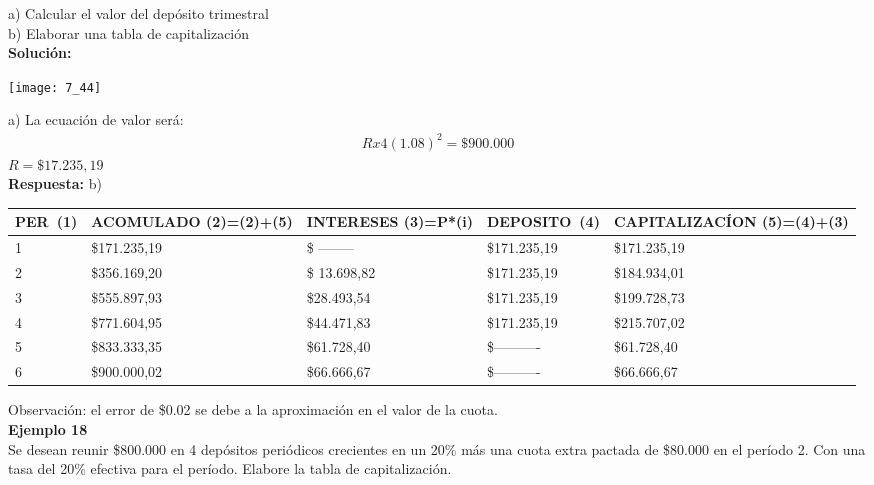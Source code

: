 a) Calcular el valor del depósito trimestral\\
b)  Elaborar una tabla de capitalización\\

\textbf{Solución:}
\begin{center}
	\texttt{[image: 7\_44]}
\end{center}
a)	  La ecuación de valor será: 
\begin{align*}
	Rx4(1.08) ^{2}=\$900.000
\end{align*}
 $ R = \$17. 235,19$\\

\textbf{Respuesta: }
b)

\begin{spacing}{1.1}
    \begin{center}
        \begin{tabular}{|p{1cm}|p{2.5cm}|p{2cm}|p{2cm}|p{3.5cm}|}
        \hline 
        \rowcolor{white!50}
            \textbf{PER\ (1)} & \textbf{ACOMULADO (2)=(2)+(5)} & \textbf{INTERESES  (3)=P*(i)}& \textbf{DEPOSITO\ (4)}& \textbf{CAPITALIZACÍON  (5)=(4)+(3)} \\ \hline                        

           
            1 & \$171.235,19  &\$ -------- & \$171.235,19   & \$171.235,19 \\ \hline
            2 & \$356.169,20 &\$ 13.698,82 & \$171.235,19   & \$184.934,01 \\ \hline
            3 & \$555.897,93 & \$28.493,54  & \$171.235,19  & \$199.728,73 \\ \hline
            4 & \$771.604,95  & \$44.471,83 & \$171.235,19   & \$215.707,02 \\ \hline
            5 & \$833.333,35 & \$61.728,40 & \$---------- & \$61.728,40 \\ \hline
            6 & \$900.000,02  & \$66.666,67& \$----------  & \$66.666,67 \\ \hline

 
\end{tabular}
\end{center}
\end{spacing}


Observación: el error de \$0.02 se debe a la aproximación en el valor de la cuota.\\

\textbf{Ejemplo 18}\\
Se desean reunir \$800.000 en 4 depósitos periódicos crecientes en un 20\% más una cuota extra pactada de \$80.000 en el período 2. Con una tasa del 20\% efectiva para el período. Elabore la tabla de capitalización.\\

